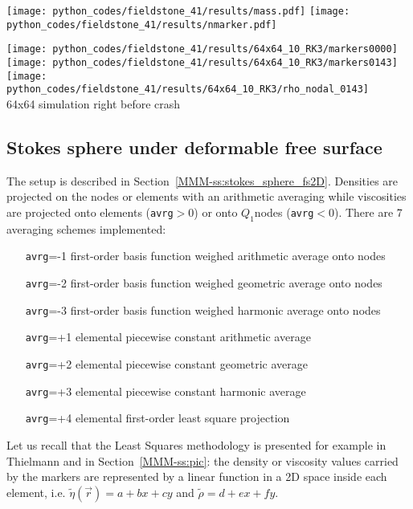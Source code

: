 \begin{center}
\texttt{[image: python\_codes/fieldstone\_41/results/mass.pdf]}
\texttt{[image: python\_codes/fieldstone\_41/results/nmarker.pdf]}
\end{center}

\begin{center}
\texttt{[image: python\_codes/fieldstone\_41/results/64x64\_10\_RK3/markers0000]}
\texttt{[image: python\_codes/fieldstone\_41/results/64x64\_10\_RK3/markers0143]}
\texttt{[image: python\_codes/fieldstone\_41/results/64x64\_10\_RK3/rho\_nodal\_0143]}\\
{\captionfont 64x64 simulation right before crash}
\end{center}


\newpage
\subsection*{Stokes sphere under deformable free surface}

The setup is described in Section~\ref{MMM-ss:stokes_sphere_fs2D}. 
Densities are projected on the nodes or elements with an arithmetic averaging while
viscosities are projected onto elements ({\tt avrg}$>0$) or onto $Q_1$nodes ({\tt avrg}$<0$).
There are 7 averaging schemes implemented:
\begin{itemize}
\item[{\tt avrg}=-1] first-order basis function weighed arithmetic average onto nodes
\item[{\tt avrg}=-2] first-order basis function weighed geometric average onto nodes
\item[{\tt avrg}=-3] first-order basis function weighed harmonic average onto nodes
\item[{\tt avrg}=+1]  elemental piecewise constant arithmetic average 
\item[{\tt avrg}=+2]  elemental piecewise constant geometric average 
\item[{\tt avrg}=+3]  elemental piecewise constant harmonic average 
\item[{\tt avrg}=+4]  elemental first-order least square projection 
\end{itemize}

Let us recall that the Least Squares methodology is presented for example in 
Thielmann \etal \cite{thmk14} and in Section~\ref{MMM-ss:pic}:
the density or viscosity values carried by the markers are represented by a linear 
function in a 2D space inside each 
element, i.e. $\tilde{\eta}({\vec r}) = a + b x+c y$ and $\tilde{\rho}=d+ex+fy$.

